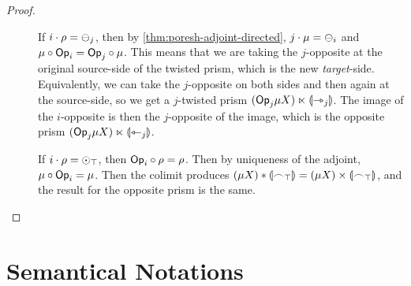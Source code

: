 \documentclass[a4paper]{memoir}
\begin{document}
\begin{proof}
\begin{description}
		\item[] If $i \cdot \rho = {\ominus}_j$, then by \cref{thm:poresh-adjoint-directed}, $j \cdot \mu = {\ominus}_i$ and $\mu \circ {\mathsf{Op}}_i = {\mathsf{Op}}_j \circ \mu$.
		This means that we are taking the $j$-opposite at the original source-side of the twisted prism, which is the new \emph{target}-side. Equivalently, we can take the $j$-opposite on both sides and then again at the source-side, so we get a $j$-twisted prism $({\mathsf{Op}}_j \mu X) \ltimes {\llparenthesis {\rightarrowtriangle}_j \rrparenthesis}$.
		The image of the $i$-opposite is then the $j$-opposite of the image, which is the opposite prism $({\mathsf{Op}}_j \mu X) \ltimes {\llparenthesis {\leftarrowtriangle}_j \rrparenthesis}$.
		
		\item[\framebox{$\nonpol_\top$}] If $i \cdot \rho = {\odot}_\top$, then ${\mathsf{Op}}_i \circ \rho = \rho$.
		Then by uniqueness of the adjoint, $\mu \circ {\mathsf{Op}}_i = \mu$.
		Then the colimit produces $(\mu X) * {\llparenthesis {\frown}_\top \rrparenthesis} = (\mu X) \times {\llparenthesis {\frown}_\top \rrparenthesis}$, and the result for the opposite prism is the same. \qedhere
	\end{description}
\end{proof}

\section{Semantical Notations} \label{sec:notations}
\end{document}
